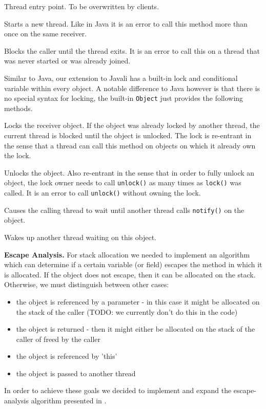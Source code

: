 \documentclass[letterpaper]{article}
\newcommand{\mypar}[1]{{\bf #1.}}
\begin{document}
\begin{description}[leftmargin=!,labelwidth=\widthof{\texttt{start()}}]
 \item[\texttt{run()}] Thread entry point. To be overwritten by clients.
 \item[\texttt{start()}] Starts a new thread. Like in Java it is an error to
 call this method more than once on the same receiver.
 \item[\texttt{join()}] Blocks the caller until the thread exits. It is an error
 to call this on a thread that was never started or was already joined.
\end{description}

Similar to Java, our extension to Javali has a built-in lock and conditional variable
within every object. A notable difference to Java however is that there is
no special syntax for locking, the built-in \texttt{Object} just provides the
following methods.

\begin{description}[leftmargin=!,labelwidth=\widthof{\texttt{unlock()}}]
 \item[\texttt{lock()}] Locks the receiver object. If the object was already locked by
 another thread, the current thread is blocked until the object is unlocked. The
 lock is re-entrant in the sense that a thread can call this method on objects
 on which it already own the lock.
 \item[\texttt{unlock()}] Unlocks the object. Also re-entrant in the sense that
 in order to fully unlock an object,
 the lock owner needs to call \texttt{unlock()} as many times as \texttt{lock()}
 was called. It is an error to call \texttt{unlock()} without owning the lock.
 \item[\texttt{wait()}] Causes the calling thread to wait until another thread
 calls \texttt{notify()} on the object.
 \item[\texttt{notify()}] Wakes up another thread waiting on this object.
\end{description} %

\mypar{Escape Analysis} For stack allocation we needed to implement an algorithm which can determine
if a certain variable (or field) escapes the method in which it is allocated. If the object does not
escape, then it can be allocated on the stack. Otherwise, we must distinguish between other cases:
\begin{itemize}
  \item the object is referenced by a parameter - in this case it might be allocated on the stack
  of the caller (TODO: we currently don't do this in the code)
  \item the object is returned - then it might either be allocated on the stack of the caller of freed
  by the caller
  \item the object is referenced by 'this'
  \item the object is passed to another thread
\end{itemize}
In order to achieve these goals we decided to implement and expand the escape-analysis algorithm presented
in \cite{Whaley:99}.
\end{document}
